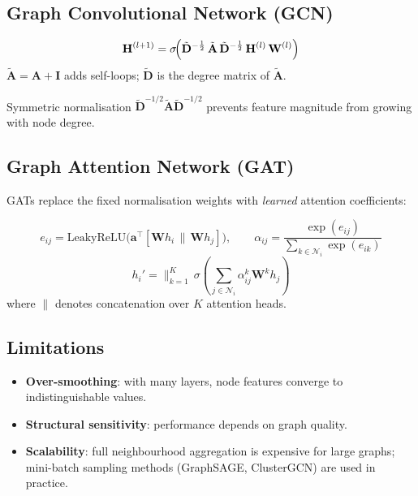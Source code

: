 \documentclass[12pt,a4paper]{report}
\newcommand{\vect}[1]{\mathbf{#1}}
\newcommand{\mat}[1]{\mathbf{#1}}
\begin{document}
\subsection{Graph Convolutional Network (GCN)}

\begin{formulabox}
\[
    \mat{H}^{(l+1)}
    = \sigma\!\Bigl(\tilde{\mat{D}}^{-\frac12}\,\tilde{\mat{A}}\,
      \tilde{\mat{D}}^{-\frac12}\,\mat{H}^{(l)}\,\mat{W}^{(l)}\Bigr)
\]
$\tilde{\mat{A}} = \mat{A} + \mat{I}$ adds self-loops;
$\tilde{\mat{D}}$ is the degree matrix of $\tilde{\mat{A}}$.
\end{formulabox}

Symmetric normalisation $\tilde{\mat{D}}^{-1/2}\tilde{\mat{A}}\tilde{\mat{D}}^{-1/2}$
prevents feature magnitude from growing with node degree.

\subsection{Graph Attention Network (GAT)}

GATs replace the fixed normalisation weights with \emph{learned} attention
coefficients:

\begin{formulabox}
\[
    e_{ij} = \mathrm{LeakyReLU}\!\bigl(\vect{a}^\top[\mat{W}h_i \,\|\, \mat{W}h_j]\bigr),
    \qquad
    \alpha_{ij} = \frac{\exp(e_{ij})}{\sum_{k\in\mathcal{N}_i}\exp(e_{ik})}
\]
\[
    h_i' = \Big\|_{k=1}^{K}\,\sigma\!\!\left(\sum_{j\in\mathcal{N}_i}\alpha_{ij}^{k}\mat{W}^{k}h_j\right)
\]
where $\|$ denotes concatenation over $K$ attention heads.
\end{formulabox}

\subsection{Limitations}

\begin{itemize}[itemsep=1pt]
    \item \textbf{Over-smoothing}: with many layers, node features converge to
          indistinguishable values.
    \item \textbf{Structural sensitivity}: performance depends on graph quality.
    \item \textbf{Scalability}: full neighbourhood aggregation is expensive for
          large graphs; mini-batch sampling methods (GraphSAGE, ClusterGCN) are
          used in practice.
\end{itemize}
\end{document}
